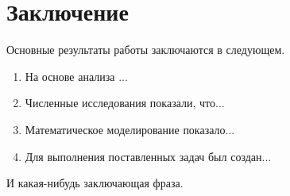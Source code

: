 \chapter*{Заключение}

Основные результаты работы заключаются в следующем.
\begin{enumerate}
 \item На основе анализа ...
 
 \item Численные исследования показали, что...

 \item Математическое моделирование показало...

 \item Для выполнения поставленных задач был создан...
\end{enumerate}
И какая-нибудь заключающая фраза.

\clearpage